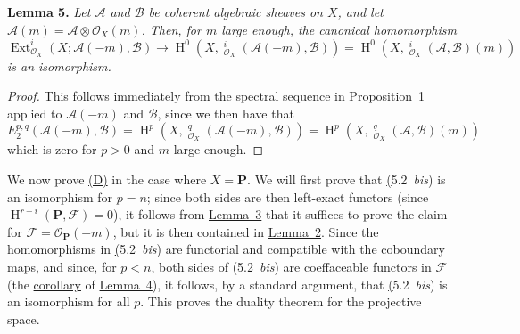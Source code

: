 \documentclass{article}
\newenvironment{itenv}[1]
  {\phantomsection\par\medskip\noindent\textbf{#1.}\itshape}
  {\par\medskip}
\newcommand{\scr}[1]{{\mathscr{#1}}}
\newcommand{\bb}{\mathbf}
\DeclareMathOperator{\Ext}{Ext}
\DeclareMathOperator{\shExt}{\underline{Ext}}
\DeclareMathOperator{\HH}{H}
\newcommand{\oldpage}[1]{\marginpar{\footnotesize$\Big\vert$ \textit{p.~#1}}}
\begin{document}
\oldpage{149-16}
\begin{itenv}{Lemma 5}
\label{lemma5}
  Let $\scr{A}$ and $\scr{B}$ be coherent algebraic sheaves on $X$, and let $\scr{A}(m)=\scr{A}\otimes\scr{O}_X(m)$.
  Then, for $m$ large enough, the canonical homomorphism
  \[
    \Ext_{\scr{O}_X}^i(X;\scr{A}(-m),\scr{B})
    \to \HH^0(X,\shExt_{\scr{O}_X}^i(\scr{A}(-m),\scr{B}))
    = \HH^0(X,\shExt_{\scr{O}_X}^i(\scr{A},\scr{B})(m))
  \]
  is an isomorphism.
\end{itenv}

\begin{proof}
  This follows immediately from the spectral sequence in \hyperref[proposition1]{Proposition~1} applied to $\scr{A}(-m)$ and $\scr{B}$, since we then have that
  \[
    E_2^{p,q}(\scr{A}(-m),\scr{B})
    = \HH^p(X,\shExt_{\scr{O}_X}^q(\scr{A}(-m),\scr{B}))
    = \HH^p(X,\shExt_{\scr{O}_X}^q(\scr{A},\scr{B})(m))
  \]
  which is zero for $p>0$ and $m$ large enough.
\end{proof}

We now prove \hyperref[(D)]{(D)} in the case where $X=\bb{P}$.
We will first prove that \hyperref[5.2bis](5.2~\emph{bis}) is an isomorphism for $p=n$;
since both sides are then left-exact functors (since $\HH^{r+i}(\bb{P},\scr{F})=0$), it follows from \hyperref[lemma3]{Lemma~3} that it suffices to prove the claim for $\scr{F}=\scr{O}_\bb{P}(-m)$, but it is then contained in \hyperref[lemma2]{Lemma~2}.
Since the homomorphisms in \hyperref[5.2bis](5.2~\emph{bis}) are functorial and compatible with the coboundary maps, and since, for $p<n$, both sides of \hyperref[5.2bis](5.2~\emph{bis}) are coeffaceable functors in $\scr{F}$ (the \hyperref[lemma3andlemma4corollary]{corollary} of \hyperref[lemma4]{Lemma~4}), it follows, by a standard argument, that \hyperref[5.2bis](5.2~\emph{bis}) is an isomorphism for all $p$.
This proves the duality theorem for the projective space.
\end{document}
